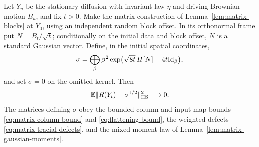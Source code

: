 \begin{proposition}\label{prop:frozen-law}
Let $Y_u$ be the stationary diffusion with invariant law $\eta$ and driving
Brownian motion $B_u$, and fix $t>0$.  Make the matrix construction of
Lemma~\ref{lem:matrix-blocks} at $Y_0$, using an independent random block
offset.  In its orthonormal frame put $N=B_t/\sqrt t$; conditionally on the
initial data and block offset, $N$ is a standard Gaussian vector.  Define,
in the initial spatial coordinates,
\begin{equation}\label{eq:matrix-frozen-covariance}
 \sigma=\bigoplus_\beta\beta^2
       \exp\bigl(\sqrt{8t}\,H[N]-4t\mathrm{Id}_\beta\bigr),
\end{equation}
and set $\sigma=0$ on the omitted kernel.  Then
\begin{equation}\label{eq:matrix-frozen-law}
 \mathbb E\|R(Y_t)-\sigma^{1/2}\|_{\mathrm{HS}}^2\longrightarrow0.
\end{equation}
The matrices defining $\sigma$ obey the bounded-column and input-map
bounds \eqref{eq:matrix-column-bound} and \eqref{eq:flattening-bound},
the weighted defects \eqref{eq:matrix-tracial-defects}, and the mixed
moment law of Lemma~\ref{lem:matrix-gaussian-moments}.
\end{proposition}
